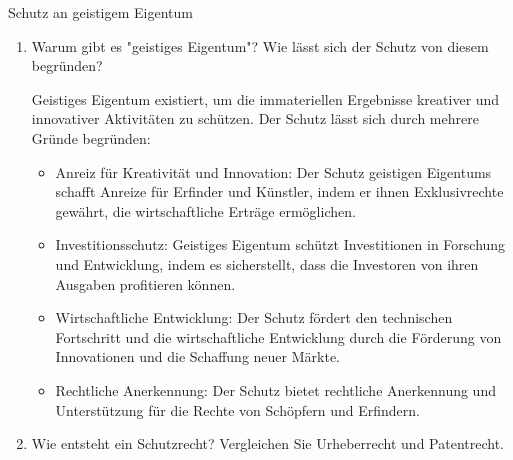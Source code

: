 \documentclass{article}
\begin{document}
\begin{exercise}{Schutz an geistigem Eigentum}
  \begin{enumerate}
    \item Warum gibt es "geistiges Eigentum"? Wie lässt sich der Schutz von diesem begründen?

          \begin{solution}
            Geistiges Eigentum existiert, um die immateriellen Ergebnisse kreativer und innovativer Aktivitäten zu schützen. Der Schutz lässt sich durch mehrere Gründe begründen:
            \begin{itemize}
              \item Anreiz für Kreativität und Innovation: Der Schutz geistigen Eigentums schafft Anreize für Erfinder und Künstler, indem er ihnen Exklusivrechte gewährt, die wirtschaftliche Erträge ermöglichen.
              \item Investitionsschutz: Geistiges Eigentum schützt Investitionen in Forschung und Entwicklung, indem es sicherstellt, dass die Investoren von ihren Ausgaben profitieren können.
              \item Wirtschaftliche Entwicklung: Der Schutz fördert den technischen Fortschritt und die wirtschaftliche Entwicklung durch die Förderung von Innovationen und die Schaffung neuer Märkte.
              \item Rechtliche Anerkennung: Der Schutz bietet rechtliche Anerkennung und Unterstützung für die Rechte von Schöpfern und Erfindern.
            \end{itemize}
          \end{solution}

    \item Wie entsteht ein Schutzrecht? Vergleichen Sie Urheberrecht und Patentrecht.


\end{enumerate}
\end{exercise}
\end{document}
